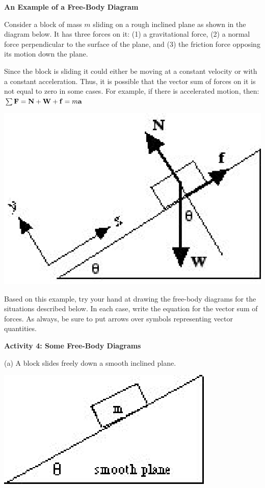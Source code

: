 \textbf{An Example of a Free-Body Diagram} 

Consider a block of mass $m$ sliding on a rough inclined plane as shown in the
diagram below. It has three forces on it: (1) a gravitational force, (2) a normal
force perpendicular to the surface of the plane, and (3) the friction force
opposing its motion down the plane.

Since the block is sliding it could either be moving at a constant velocity
or with a constant acceleration. Thus, it is possible that the vector sum of
forces on it is not equal to zero in some cases. For example, if there is accelerated
motion, then: \( \sum {\bf F} = {\bf N} + {\bf W} + {\bf f}
= m{\bf a}\)

\vspace{0.3cm}
{\par\centering \includegraphics{friction/friction_fig2.eps} \par}
\vspace{0.3cm}

Based on this example, try your hand at drawing the free-body diagrams for the
situations described below. In each case, write the equation for the vector
sum of forces. As always, be sure to put arrows over symbols representing vector
quantities.

\bigskip
\textbf{Activity 4: Some Free-Body Diagrams} 

(a) A block slides freely down a smooth inclined plane.

\vspace{0.3cm}
{\par\centering \includegraphics{friction/friction_fig3.eps} \par}
\vspace{0.3cm}

